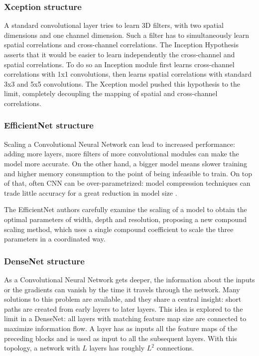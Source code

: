 \subsubsection{Xception structure}

A standard convolutional layer tries to learn 3D filters, with two spatial
dimensions and one channel dimension.
Such a filter has to simultaneously learn spatial correlations and
cross-channel correlations.
The Inception Hypothesis asserts that it would be easier to learn independently
the cross-channel and spatial correlations.
To do so an Inception module first learns cross-channel correlations with 1x1
convolutions, then learns spatial correlations with standard 3x3 and 5x5
convolutions.
The Xception model pushed this hypothesis to the limit, completely decoupling
the mapping of spatial and cross-channel correlations.

\subsubsection{EfficientNet structure}

Scaling a Convolutional Neural Network can lead to increased performance:
adding more layers, more filters of more convolutional modules can make the
model more accurate. On the other hand, a bigger model means slower training
and higher memory consumption to the point of being infeasible to train.
On top of that, often CNN can be over-parametrized: model compression
techniques can trade little accuracy for a great reduction in model size
\cite{han2016deep}.

The EfficientNet authors carefully examine the scaling of a model to obtain the
optimal parameters of width, depth and resolution, proposing a new compound
scaling method, which uses a single compound coefficient to scale the three
parameters in a coordinated way.

\subsubsection{DenseNet structure}

As a Convolutional Neural Network gets deeper, the information about the inputs
or the gradients can vanish by the time it travels through the network.
Many solutions to this problem are available, and they share a central insight:
short paths are created from early layers to later layers.
This idea is explored to the limit in a DenseNet: all layers with matching feature
map size are connected to maximize information flow.
A layer has as inputs all the feature maps of the preceding blocks and is used
as input to all the subsequent layers.
With this topology, a network with $L$ layers has roughly $L^2$ connections.

